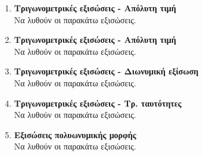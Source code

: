 \documentclass[twoside,nofonts,internet]{askhseis}
\begin{document}
\begin{enumerate}
\item \textbf{Τριγωνομετρικές εξισώσεις - Απόλυτη τιμή}\\
Να λυθούν οι παρακάτω εξισώσεις.
\item \textbf{Τριγωνομετρικές εξισώσεις - Απόλυτη τιμή}\\
Να λυθούν οι παρακάτω εξισώσεις.
\item \textbf{Τριγωνομετρικές εξισώσεις - Διωνυμική εξίσωση}\\
Να λυθούν οι παρακάτω εξισώσεις.
\begin{multicols}{2}
\end{multicols}
\item \textbf{Τριγωνομετρικές εξισώσεις - Τρ. ταυτότητες}\\
Να λυθούν οι παρακάτω εξισώσεις.
\item \textbf{Εξισώσεις πολυωνυμικής μορφής}\\
Να λυθούν οι παρακάτω εξισώσεις.
\begin{rlist}

\end{rlist}
\end{enumerate}
\end{document}
